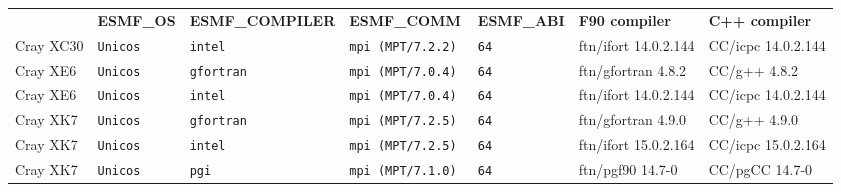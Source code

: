 \begin{longtable}{lllllll}
  &{\bfseries\footnotesize ESMF\_OS} &{\bfseries\footnotesize ESMF\_COMPILER} & {\bfseries\footnotesize ESMF\_COMM} & {\bfseries\footnotesize ESMF\_ABI} &
  {\bfseries\footnotesize F90 compiler} & {\bfseries\footnotesize C++ compiler} \\

Cray XC30             &\tt Unicos &\tt intel        &\tt mpi (MPT/7.2.2)  &\tt 64           & ftn/ifort \footnotesize 14.0.2.144  & CC/icpc \footnotesize 14.0.2.144\\ %
Cray XE6              &\tt Unicos &\tt gfortran     &\tt mpi (MPT/7.0.4)  &\tt 64           & ftn/gfortran \footnotesize 4.8.2    & CC/g++  \footnotesize 4.8.2     \\ %
Cray XE6              &\tt Unicos &\tt intel        &\tt mpi (MPT/7.0.4)  &\tt 64           & ftn/ifort \footnotesize 14.0.2.144  & CC/icpc \footnotesize 14.0.2.144\\ %
Cray XK7              &\tt Unicos &\tt gfortran     &\tt mpi (MPT/7.2.5)  &\tt 64           & ftn/gfortran \footnotesize 4.9.0    & CC/g++  \footnotesize 4.9.0     \\ %
Cray XK7              &\tt Unicos &\tt intel        &\tt mpi (MPT/7.2.5)  &\tt 64           & ftn/ifort \footnotesize 15.0.2.164  & CC/icpc \footnotesize 15.0.2.164\\ %
Cray XK7              &\tt Unicos &\tt pgi          &\tt mpi (MPT/7.1.0)  &\tt 64           & ftn/pgf90 \footnotesize 14.7-0      & CC/pgCC \footnotesize 14.7-0    \\ %

\end{longtable}
